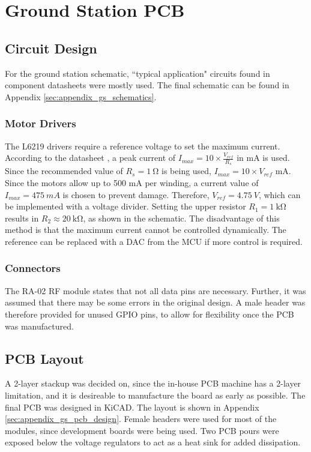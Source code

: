 \graphicspath{{./figures}}

\section{Ground Station PCB}
\subsection{Circuit Design}
For the ground station schematic, ``typical application" circuits found in component datasheets were mostly used. The final schematic can be found in Appendix \ref{sec:appendix_gs_schematics}.

\subsubsection{Motor Drivers}
The L6219 drivers require a reference voltage to set the maximum current. According to the datasheet \cite{datasheet-L6219}, a peak current of $I_{max} = 10 \times \frac{V_{ref}}{R_s}$ in mA is used. Since the recommended value of $R_s = \SI{1}{\ohm}$ is being used, $I_{max} = 10 \times V_{ref}$ mA. Since the motors allow up to 500 mA per winding, a current value of $I_{max} = \SI{475}{mA}$ is chosen to prevent damage. Therefore, $V_{ref} = \SI{4.75}{V}$, which can be implemented with a voltage divider. Setting the upper resistor $R_1 = \SI{1}{\kilo \ohm}$ results in $R_2 \approx \SI{20}{\kilo \ohm}$, as shown in the schematic. The disadvantage of this method is that the maximum current cannot be controlled dynamically. The reference can be replaced with a DAC from the MCU if more control is required.

\subsubsection{Connectors}
The RA-02 RF module states that not all data pins are necessary. Further, it was assumed that there may be some errors in the original design. A male header was therefore provided for unused GPIO pins, to allow for flexibility once the PCB was manufactured.

\subsection{PCB Layout}
A 2-layer stackup was decided on, since the in-house PCB machine has a 2-layer limitation, and it is desireable to manufacture the board as early as possible. The final PCB was designed in KiCAD. The layout is shown in Appendix \ref{sec:appendix_gs_pcb_design}. Female headers were used for most of the modules, since development boards were being used. Two PCB pours were exposed below the voltage regulators to act as a heat sink for added dissipation.